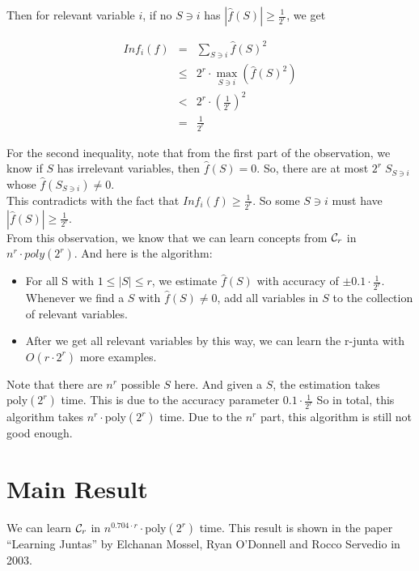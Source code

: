 \documentclass[12pt]{article}
\newcommand{\calc}{{\cal C}}
\newcommand{\poly}{\mathrm{poly}}
\begin{document}
Then for relevant variable $i$, if no $S \ni i$ has $|\hat {f}(S)| \ge
\frac {1}{2^r}$, we get

\begin{eqnarray*}
Inf_i(f)
&=& \sum_{S \ni i} \hat {f}(S)^2 \\
&\le& 2^r \cdot \max_{S \ni i} {(\hat {f}(S)^2)} \\
&<& 2^r \cdot (\frac{1}{2^r})^2 \\
&=& \frac {1}{2^r}
\end{eqnarray*}

For the second inequality, note that from the first part of the
observation, we know if $S$ has irrelevant variables, then $\hat
{f}(S) = 0$. So, there are at most $2^r \; S_{S \ni i}$ whose $\hat
{f}(S_{S \ni i}) \neq 0$. \\

This contradicts with the fact that $Inf_i(f) \ge \frac{1}{2^r}$. So
some $S \ni i$ must have $|\hat {f}(S)| \ge \frac {1}{2^r}$. \\

From this observation, we know that we can learn concepts from
$\calc_r$ in $n^r \cdot poly(2^r)$. And here is the algorithm:

\begin{itemize}
\item For all S with $1 \le |S| \le r$, we estimate $\hat {f}(S)$
  with accuracy of $\pm 0.1 \cdot \frac {1}{2^r}$. Whenever we find
  a $S$ with $\hat {f}(S) \neq 0$, add all variables in $S$ to the
  collection of relevant variables.
\item After we get all relevant variables by this way, we can learn
  the r-junta with $O(r \cdot 2^r)$ more examples.
\end{itemize}

Note that there are $n^r$ possible $S$ here. And given a $S$, the
estimation takes $\poly (2^r)$ time. This is due to the accuracy
parameter $0.1 \cdot \frac {1}{2^r}$ So in total, this algorithm takes
$n^r \cdot \poly (2^r)$ time. Due to the $n^r$ part, this algorithm is
still not good enough.

\section{Main Result}

We can learn $\calc_r$ in $n^{0.704 \cdot r} \cdot \poly(2^r)$
time. This result is shown in the paper ``Learning Juntas'' by
Elchanan Mossel, Ryan O'Donnell and Rocco Servedio in 2003. \\
\end{document}
